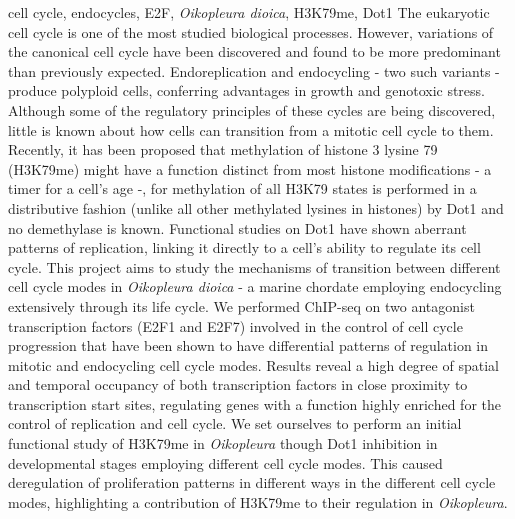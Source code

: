\documentclass[11pt,twoside,a4paper]{report}
\begin{document}

\TitlePage
    \vspace*{55mm}
        {cell cycle, endocycles, E2F, \textit{Oikopleura dioica}, H3K79me, Dot1}
		{The eukaryotic cell cycle is one of the most studied biological processes. However, variations of the canonical cell cycle have been discovered and found to be more predominant than previously expected. Endoreplication and endocycling - two such variants - produce polyploid cells, conferring advantages in growth and genotoxic stress. Although some of the regulatory principles of these cycles are being discovered, little is known about how cells can transition from a mitotic cell cycle to them.
		Recently, it has been proposed that methylation of histone 3 lysine 79 (H3K79me) might have a function distinct from most histone modifications - a timer for a cell's age -, for methylation of all H3K79 states is performed in a distributive fashion (unlike all other methylated lysines in histones) by Dot1 and no demethylase is known. Functional studies on Dot1 have shown aberrant patterns of replication, linking it directly to a cell's ability to regulate its cell cycle.
		This project aims to study the mechanisms of transition between different cell cycle modes in \textit{Oikopleura dioica} - a marine chordate employing endocycling extensively through its life cycle.
		We performed ChIP-seq on two antagonist transcription factors (E2F1 and E2F7) involved in the control of cell cycle progression that have been shown to have differential patterns of regulation in mitotic and endocycling cell cycle modes. Results reveal a high degree of spatial and temporal occupancy of both transcription factors in close proximity to transcription start sites, regulating genes with a function highly enriched for the control of replication and cell cycle. We set ourselves to perform an initial functional study of H3K79me in \textit{Oikopleura} though Dot1 inhibition in developmental stages employing different cell cycle modes. This caused deregulation of proliferation patterns in different ways in the different cell cycle modes, highlighting a contribution of H3K79me to their regulation in \textit{Oikopleura}.
		}
\EndTitlePage

\cleardoublepage

\end{document}
